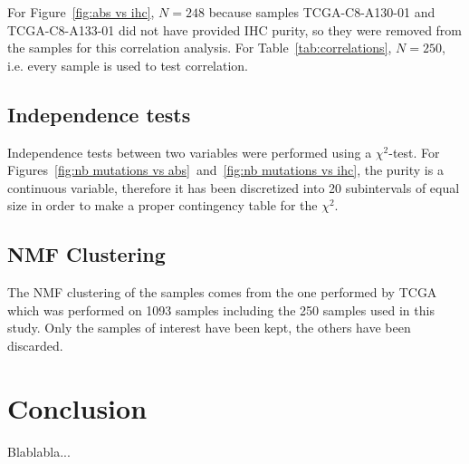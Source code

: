 \documentclass[letterpaper]{article}
\begin{document}
For Figure~\ref{fig:abs vs ihc}, $N=248$ because samples TCGA-C8-A130-01 and TCGA-C8-A133-01 did not have provided IHC purity, so they were removed from the samples
for this correlation analysis. For Table~\ref{tab:correlations}, $N = 250$, i.e. every sample is used to test correlation.

\subsection{Independence tests}
Independence tests between two variables were performed using a $\chi^2$-test. For Figures~\ref{fig:nb mutations vs abs}~and~\ref{fig:nb mutations vs ihc}, the purity is a
continuous variable, therefore it has been discretized into 20 subintervals of equal size in order to make a proper contingency table for the $\chi^2$.

\subsection{NMF Clustering}
The NMF clustering of the samples comes from the one performed by TCGA which was performed on 1093 samples including the 250 samples used in this study. Only the samples
of interest have been kept, the others have been discarded.

\section{Conclusion}
Blablabla...

\newpage
\footnotesize

{}
\end{document}
